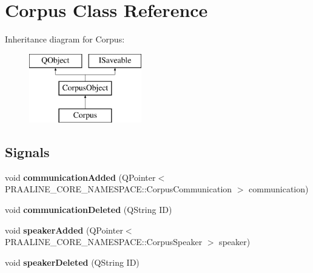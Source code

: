 \hypertarget{class_corpus}{}\section{Corpus Class Reference}
\label{class_corpus}
Inheritance diagram for Corpus\+:\begin{figure}[H]
\begin{center}
\leavevmode
\includegraphics[height=3.000000cm]{class_corpus}
\end{center}
\end{figure}
\subsection*{Signals}
\begin{DoxyCompactItemize}
\item 
\mbox{\label{class_corpus_af27c09a3d9a2cdd3307f133331e8af81}} 
void {\bfseries communication\+Added} (Q\+Pointer$<$ P\+R\+A\+A\+L\+I\+N\+E\+\_\+\+C\+O\+R\+E\+\_\+\+N\+A\+M\+E\+S\+P\+A\+C\+E\+::\+Corpus\+Communication $>$ communication)
\item 
\mbox{\label{class_corpus_a0ae2650c2acc7495ed72d4501ef43df7}} 
void {\bfseries communication\+Deleted} (Q\+String ID)
\item 
\mbox{\label{class_corpus_a6a2a743b27ef679643e316df3d5c06a6}} 
void {\bfseries speaker\+Added} (Q\+Pointer$<$ P\+R\+A\+A\+L\+I\+N\+E\+\_\+\+C\+O\+R\+E\+\_\+\+N\+A\+M\+E\+S\+P\+A\+C\+E\+::\+Corpus\+Speaker $>$ speaker)
\item 
\mbox{\label{class_corpus_a4701e900ef2d20093c31e81ab23f32db}} 
void {\bfseries speaker\+Deleted} (Q\+String ID)
\end{DoxyCompactItemize}
